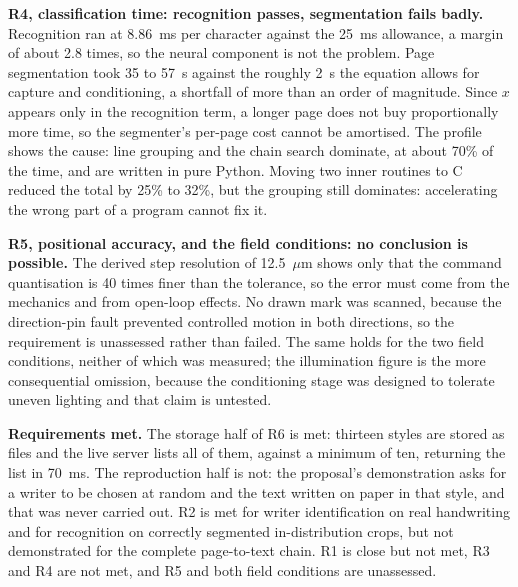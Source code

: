         \textbf{R4, classification time: recognition passes, segmentation fails badly.}
        Recognition ran at 8.86~ms per character against the 25~ms allowance, a margin of about 2.8 times, so the neural component is not the problem.
        Page segmentation took 35 to 57~s against the roughly 2~s the equation allows for capture and conditioning, a shortfall of more than an order of magnitude.
        Since $x$ appears only in the recognition term, a longer page does not buy proportionally more time, so the segmenter's per-page cost cannot be amortised.
        The profile shows the cause: line grouping and the chain search dominate, at about 70\% of the time, and are written in pure Python.
        Moving two inner routines to C reduced the total by 25\% to 32\%, but the grouping still dominates: accelerating the wrong part of a program cannot fix it.

        \textbf{R5, positional accuracy, and the field conditions: no conclusion is possible.}
        The derived step resolution of 12.5~$\mu$m shows only that the command quantisation is 40 times finer than the tolerance, so the error must come from the mechanics and from open-loop effects.
        No drawn mark was scanned, because the direction-pin fault prevented controlled motion in both directions, so the requirement is unassessed rather than failed.
        The same holds for the two field conditions, neither of which was measured; the illumination figure is the more consequential omission, because the conditioning stage was designed to tolerate uneven lighting and that claim is untested.

        \textbf{Requirements met.}
        The storage half of R6 is met: thirteen styles are stored as files and the live server lists all of them, against a minimum of ten, returning the list in 70~ms. The reproduction half is not: the proposal's demonstration asks for a writer to be chosen at random and the text written on paper in that style, and that was never carried out.
        R2 is met for writer identification on real handwriting and for recognition on correctly segmented in-distribution crops, but not demonstrated for the complete page-to-text chain.
        R1 is close but not met, R3 and R4 are not met, and R5 and both field conditions are unassessed.

